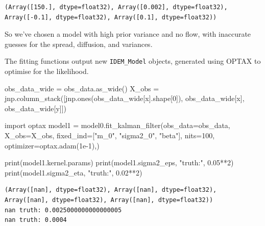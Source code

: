 \documentclass[
]{report}
\newenvironment{Shaded}{\begin{snugshade}}{\end{snugshade}}
\newcommand{\BuiltInTok}[1]{\textcolor[rgb]{0.00,0.23,0.31}{#1}}
\newcommand{\DecValTok}[1]{\textcolor[rgb]{0.68,0.00,0.00}{#1}}
\newcommand{\FloatTok}[1]{\textcolor[rgb]{0.68,0.00,0.00}{#1}}
\newcommand{\ImportTok}[1]{\textcolor[rgb]{0.00,0.46,0.62}{#1}}
\newcommand{\NormalTok}[1]{\textcolor[rgb]{0.00,0.23,0.31}{#1}}
\newcommand{\OperatorTok}[1]{\textcolor[rgb]{0.37,0.37,0.37}{#1}}
\newcommand{\StringTok}[1]{\textcolor[rgb]{0.13,0.47,0.30}{#1}}
\begin{document}
\begin{verbatim}
(Array([150.], dtype=float32), Array([0.002], dtype=float32), Array([-0.1], dtype=float32), Array([0.1], dtype=float32))
\end{verbatim}

So we've chosen a model with high prior variance and no flow, with
inaccurate guesses for the spread, diffusion, and variances.

The fitting functions output new \texttt{IDEM\_Model} objects, generated
using OPTAX to optimise for the likelihood.

\begin{Shaded}
\begin{Highlighting}[]
\NormalTok{obs\_data\_wide }\OperatorTok{=}\NormalTok{ obs\_data.as\_wide()}
\NormalTok{X\_obs }\OperatorTok{=}\NormalTok{ jnp.column\_stack([jnp.ones(obs\_data\_wide[}\StringTok{\textquotesingle{}x\textquotesingle{}}\NormalTok{].shape[}\DecValTok{0}\NormalTok{]), obs\_data\_wide[}\StringTok{\textquotesingle{}x\textquotesingle{}}\NormalTok{], obs\_data\_wide[}\StringTok{\textquotesingle{}y\textquotesingle{}}\NormalTok{]])}

\ImportTok{import}\NormalTok{ optax}
\NormalTok{model1 }\OperatorTok{=}\NormalTok{ model0.fit\_kalman\_filter(obs\_data}\OperatorTok{=}\NormalTok{obs\_data,}
\NormalTok{                                  X\_obs}\OperatorTok{=}\NormalTok{X\_obs,}
\NormalTok{                                  fixed\_ind}\OperatorTok{=}\NormalTok{[}\StringTok{"m\_0"}\NormalTok{, }\StringTok{"sigma2\_0"}\NormalTok{, }\StringTok{"beta"}\NormalTok{],}
\NormalTok{                                  nits}\OperatorTok{=}\DecValTok{100}\NormalTok{,}
\NormalTok{                                  optimizer}\OperatorTok{=}\NormalTok{optax.adam(}\FloatTok{1e{-}1}\NormalTok{),)}
\end{Highlighting}
\end{Shaded}

\begin{Shaded}
\begin{Highlighting}[]
\BuiltInTok{print}\NormalTok{(model1.kernel.params)}
\BuiltInTok{print}\NormalTok{(model1.sigma2\_eps, }\StringTok{"truth:"}\NormalTok{, }\FloatTok{0.05}\OperatorTok{**}\DecValTok{2}\NormalTok{)}
\BuiltInTok{print}\NormalTok{(model1.sigma2\_eta, }\StringTok{"truth:"}\NormalTok{, }\FloatTok{0.02}\OperatorTok{**}\DecValTok{2}\NormalTok{)}
\end{Highlighting}
\end{Shaded}

\begin{verbatim}
(Array([nan], dtype=float32), Array([nan], dtype=float32), Array([nan], dtype=float32), Array([nan], dtype=float32))
nan truth: 0.0025000000000000005
nan truth: 0.0004
\end{verbatim}
\end{document}

